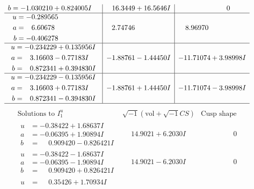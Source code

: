 \documentclass[1p]{elsarticle_modified}
\theoremstyle{definition}
\newcommand{\I}{\sqrt{-1}}
\begin{document}
$$\begin{array}{c|c|c}
\begin{aligned}
b &= -1.030210 + 0.824005 I\end{aligned}
 & \phantom{-}16.3449 + 16.5646 I & \phantom{-0.000000 } 0 \\ \hline\begin{aligned}
u &= -0.289565\phantom{ +0.000000I} \\
a &= \phantom{-}6.60678\phantom{ +0.000000I} \\
b &= -0.406278\phantom{ +0.000000I}\end{aligned}
 & \phantom{-}2.74746\phantom{ +0.000000I} & \phantom{-}8.96970\phantom{ +0.000000I} \\ \hline\begin{aligned}
u &= -0.234229 + 0.135956 I \\
a &= \phantom{-}3.16603 - 0.77183 I \\
b &= \phantom{-}0.872341 + 0.394830 I\end{aligned}
 & -1.88761 - 1.44450 I & -11.71074 + 3.98998 I \\ \hline\begin{aligned}
u &= -0.234229 - 0.135956 I \\
a &= \phantom{-}3.16603 + 0.77183 I \\
b &= \phantom{-}0.872341 - 0.394830 I\end{aligned}
 & -1.88761 + 1.44450 I & -11.71074 - 3.98998 I\\
 \hline 
 \end{array}$$\newpage$$\begin{array}{c|c|c}  
\text{Solutions to }I^u_{1}& \I (\text{vol} + \sqrt{-1}CS) & \text{Cusp shape}\\
 \hline 
\begin{aligned}
u &= -0.38422 + 1.68637 I \\
a &= -0.06395 + 1.90894 I \\
b &= \phantom{-}0.909420 - 0.826421 I\end{aligned}
 & \phantom{-}14.9021 + 6.2030 I & \phantom{-0.000000 } 0 \\ \hline\begin{aligned}
u &= -0.38422 - 1.68637 I \\
a &= -0.06395 - 1.90894 I \\
b &= \phantom{-}0.909420 + 0.826421 I\end{aligned}
 & \phantom{-}14.9021 - 6.2030 I & \phantom{-0.000000 } 0 \\ \hline\begin{aligned}
u &= \phantom{-}0.35426 + 1.70934 I \\

\end{aligned}
\end{array}$$
\end{document}
